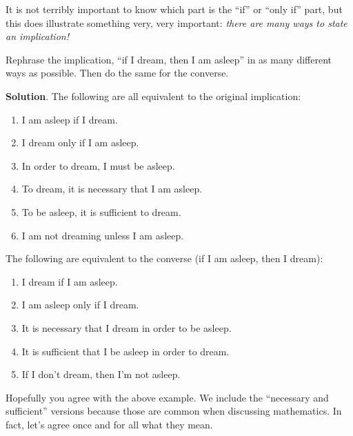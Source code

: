 \documentclass[11pt,]{book}
\theoremstyle{ptxplainnotitle}
\theoremstyle{ptxplaintitle}
\theoremstyle{ptxdefinitionnotitle}
\theoremstyle{ptxdefinitiontitle}
\theoremstyle{ptxdefinitionnotitle}
\theoremstyle{ptxdefinitiontitle}
\theoremstyle{ptxdefinitionnotitle}
\theoremstyle{ptxdefinitiontitle}
\theoremstyle{ptxdefinitiontitlenonumber}
\theoremstyle{ptxdefinitiontitlenonumber}
\numberwithin{equation}{chapter}
\begin{document}
\hypertarget{p-1748}{}%
It is not terribly important to know which part is the ``if'' or ``only if'' part, but this does illustrate something very, very important: \emph{there are many ways to state an implication!}%
\begin{example}\label{example-54}
\hypertarget{p-1749}{}%
Rephrase the implication, ``if I dream, then I am asleep'' in as many different ways as possible. Then do the same for the converse.%
\par\smallskip%
\noindent\textbf{Solution}.\hypertarget{solution-199}{}\quad%
\hypertarget{p-1750}{}%
The following are all equivalent to the original implication: \leavevmode%
\begin{enumerate}
\item\hypertarget{li-738}{}\hypertarget{p-1751}{}%
I am asleep if I dream.%
\item\hypertarget{li-739}{}\hypertarget{p-1752}{}%
I dream only if I am asleep.%
\item\hypertarget{li-740}{}\hypertarget{p-1753}{}%
In order to dream, I must be asleep.%
\item\hypertarget{li-741}{}\hypertarget{p-1754}{}%
To dream, it is necessary that I am asleep.%
\item\hypertarget{li-742}{}\hypertarget{p-1755}{}%
To be asleep, it is sufficient to dream.%
\item\hypertarget{li-743}{}\hypertarget{p-1756}{}%
I am not dreaming unless I am asleep.%
\end{enumerate}
 The following are equivalent to the converse (if I am asleep, then I dream): \leavevmode%
\begin{enumerate}
\item\hypertarget{li-744}{}\hypertarget{p-1757}{}%
I dream if I am asleep.%
\item\hypertarget{li-745}{}\hypertarget{p-1758}{}%
I am asleep only if I dream.%
\item\hypertarget{li-746}{}\hypertarget{p-1759}{}%
It is necessary that I dream in order to be asleep.%
\item\hypertarget{li-747}{}\hypertarget{p-1760}{}%
It is sufficient that I be asleep in order to dream.%
\item\hypertarget{li-748}{}\hypertarget{p-1761}{}%
If I don't dream, then I'm not asleep.%
\end{enumerate}
%
\end{example}
\hypertarget{p-1762}{}%
Hopefully you agree with the above example. We include the ``necessary and sufficient'' versions because those are common when discussing mathematics. In fact, let's agree once and for all what they mean.%
\end{document}
